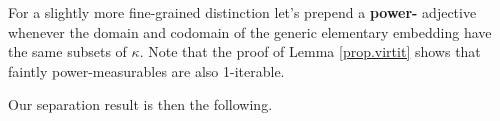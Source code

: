 \documentclass[../main]{subfiles}
\begin{document}
\qquad For a slightly more fine-grained distinction let's prepend a \textbf{power-} adjective whenever the domain and codomain of the generic elementary embedding have the same subsets of $\kappa$. Note that the proof of Lemma \ref{prop.virtit} shows that faintly power-measurables are also 1-iterable.

%
%
%
%

\qquad Our separation result is then the following.
\end{document}

